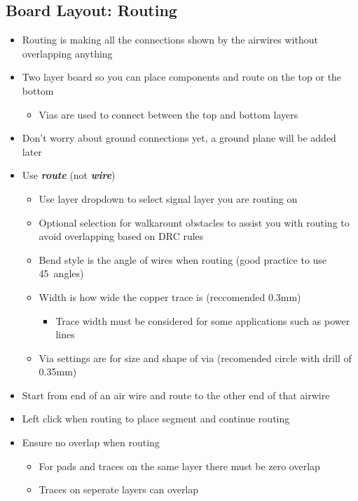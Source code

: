 \documentclass{article}
\begin{document}
\subsection{Board Layout: Routing}
\begin{itemize}
    \item Routing is making all the connections shown by the airwires without
    overlapping anything
    \item Two layer board so you can place components and route on the top or
    the bottom
    \begin{itemize}
        \item Vias are used to connect between the top and bottom layers
    \end{itemize}
    \item Don't worry about ground connections yet, a ground plane will be added
    later
    \item Use \textit{\textbf{route}} (not \textit{\textbf{wire}})
    \begin{itemize}
        \item Use layer dropdown to select signal layer you are routing on
        \item Optional selection for walkarount obstacles to assist you with
        routing to avoid overlapping based on DRC rules
        \item Bend style is the angle of wires when routing (good practice to
        use 45\degree\ angles)
        \item Width is how wide the copper trace is (reccomended 0.3mm)
        \begin{itemize}
            \item Trace width must be considered for some applications such
            as power lines
        \end{itemize}
        \item Via settings are for size and shape of via (recomended circle
        with drill of 0.35mm)
    \end{itemize}
    \item Start from end of an air wire and route to the other end of that
    airwire
    \item Left click when routing to place segment and continue routing
    \item Ensure no overlap when routing
    \begin{itemize}
        \item For pads and traces on the same layer there must be zero overlap
        \item Traces on seperate layers can overlap

\end{itemize}
\end{itemize}
\end{document}
